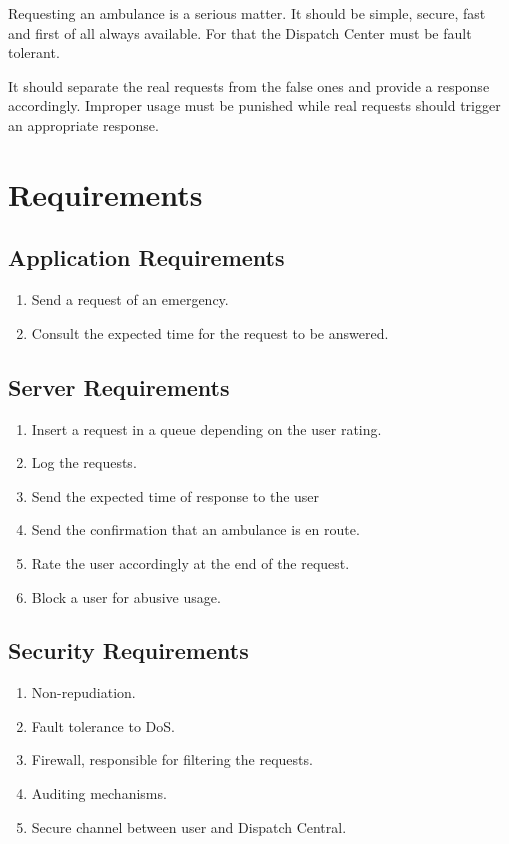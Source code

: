 \documentclass[a4paper,titlepage,11pt]{article}
\begin{document}
Requesting an ambulance is a serious matter.
It should be simple, secure, fast and first of all always available.
For that the Dispatch Center must be fault tolerant.

It should separate the real requests from the false ones and provide a response accordingly.
Improper usage must be punished while real requests should trigger an appropriate response.

\section{Requirements}

\subsection{Application Requirements}
\begin{enumerate}
  \item Send a request of an emergency.
  \item Consult the expected time for the request to be answered.
\end{enumerate}

\subsection{Server Requirements}
\begin{enumerate}
  \item Insert a request in a queue depending on the user rating.
  \item Log the requests.
  \item Send the expected time of response to the user
  \item Send the confirmation that an ambulance is en route.
  \item Rate the user accordingly at the end of the request.
  \item Block a user for abusive usage.                                                         %
\end{enumerate}

\subsection{Security Requirements}
\begin{enumerate}
  \item Non-repudiation.
  \item Fault tolerance to DoS.
  \item Firewall, responsible for filtering the requests.
  \item Auditing mechanisms.
  \item Secure channel between user and Dispatch Central.
\end{enumerate}
\end{document}
